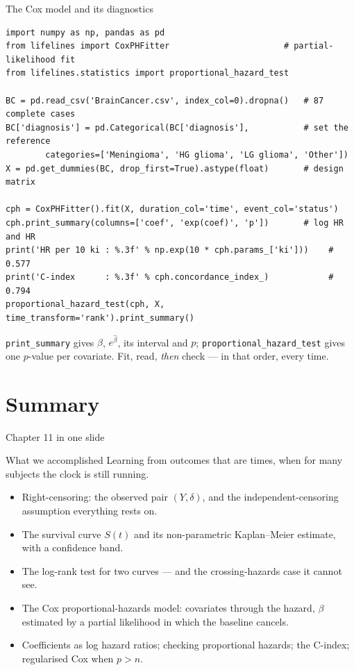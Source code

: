 \documentclass[aspectratio=169,11pt]{beamer}
\begin{document}
\begin{frame}[fragile]{The Cox model and its diagnostics}
  \begin{lstlisting}[basicstyle=\ttfamily\scriptsize]
import numpy as np, pandas as pd
from lifelines import CoxPHFitter                       # partial-likelihood fit
from lifelines.statistics import proportional_hazard_test

BC = pd.read_csv('BrainCancer.csv', index_col=0).dropna()   # 87 complete cases
BC['diagnosis'] = pd.Categorical(BC['diagnosis'],           # set the reference
        categories=['Meningioma', 'HG glioma', 'LG glioma', 'Other'])
X = pd.get_dummies(BC, drop_first=True).astype(float)       # design matrix

cph = CoxPHFitter().fit(X, duration_col='time', event_col='status')
cph.print_summary(columns=['coef', 'exp(coef)', 'p'])       # log HR and HR
print('HR per 10 ki : %.3f' % np.exp(10 * cph.params_['ki']))    # 0.577
print('C-index      : %.3f' % cph.concordance_index_)            # 0.794
proportional_hazard_test(cph, X, time_transform='rank').print_summary()
  \end{lstlisting}
  \begin{takeaway}
    \texttt{print\_summary} gives $\hat\beta$, $e^{\hat\beta}$, its interval and $p$;
    \texttt{proportional\_hazard\_test} gives one $p$-value per covariate. Fit, read,
    \emph{then} check --- in that order, every time.
  \end{takeaway}
\end{frame}

\section{Summary}

\begin{frame}{Chapter 11 in one slide}
  \begin{block}{What we accomplished}
    Learning from outcomes that are times, when for many subjects the clock is
    still running.
  \end{block}
  \begin{itemize}
    \item Right-censoring: the observed pair $(Y,\delta)$, and the
          independent-censoring assumption everything rests on.
    \item The survival curve $S(t)$ and its non-parametric Kaplan--Meier estimate,
          with a confidence band.
    \item The log-rank test for two curves --- and the crossing-hazards case it
          cannot see.
    \item The Cox proportional-hazards model: covariates through the hazard, $\beta$
          estimated by a partial likelihood in which the baseline cancels.
    \item Coefficients as log hazard ratios; checking proportional hazards; the
          C-index; regularised Cox when $p>n$.
  \end{itemize}
\end{frame}
\end{document}
